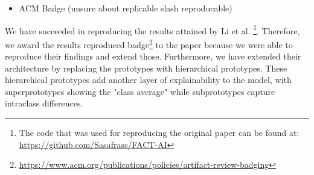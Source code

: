 \begin{itemize}
    \item ACM Badge (unsure about replicable slash reproducable)
\end{itemize}

We have succeeded in reproducing the results attained by Li et al. \citep{li2018deep} \footnote{The code that was used for reproducing the original paper can be found at: \url{https://github.com/Sasafrass/FACT-AI}}. Therefore, we award the results reproduced badge\footnote{\url{https://www.acm.org/publications/policies/artifact-review-badging}} to the paper because we were able to reproduce their findings and extend those. Furthermore, we have extended their architecture by replacing the prototypes with hierarchical prototypes. These hierarchical prototypes add another layer of explainability to the model, with superprototypes showing the "class average" while subprototypes capture intraclass differences.


